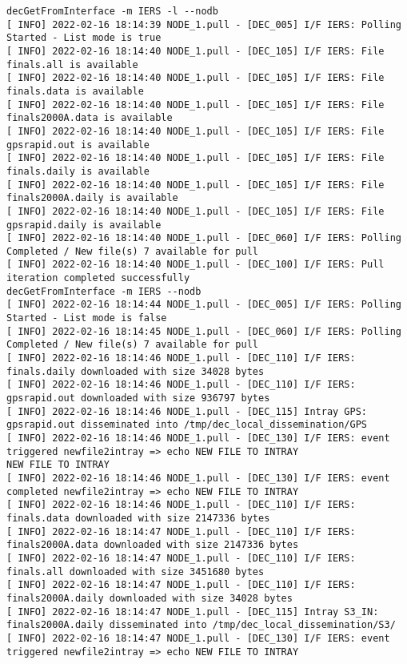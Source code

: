 \documentclass[dec_sum_main.tex]{subfiles}
\begin{document}
\begin{Verbatim}[fontsize=\tiny]
decGetFromInterface -m IERS -l --nodb
[ INFO] 2022-02-16 18:14:39 NODE_1.pull - [DEC_005] I/F IERS: Polling Started - List mode is true
[ INFO] 2022-02-16 18:14:40 NODE_1.pull - [DEC_105] I/F IERS: File finals.all is available
[ INFO] 2022-02-16 18:14:40 NODE_1.pull - [DEC_105] I/F IERS: File finals.data is available
[ INFO] 2022-02-16 18:14:40 NODE_1.pull - [DEC_105] I/F IERS: File finals2000A.data is available
[ INFO] 2022-02-16 18:14:40 NODE_1.pull - [DEC_105] I/F IERS: File gpsrapid.out is available
[ INFO] 2022-02-16 18:14:40 NODE_1.pull - [DEC_105] I/F IERS: File finals.daily is available
[ INFO] 2022-02-16 18:14:40 NODE_1.pull - [DEC_105] I/F IERS: File finals2000A.daily is available
[ INFO] 2022-02-16 18:14:40 NODE_1.pull - [DEC_105] I/F IERS: File gpsrapid.daily is available
[ INFO] 2022-02-16 18:14:40 NODE_1.pull - [DEC_060] I/F IERS: Polling Completed / New file(s) 7 available for pull
[ INFO] 2022-02-16 18:14:40 NODE_1.pull - [DEC_100] I/F IERS: Pull iteration completed successfully
decGetFromInterface -m IERS --nodb
[ INFO] 2022-02-16 18:14:44 NODE_1.pull - [DEC_005] I/F IERS: Polling Started - List mode is false
[ INFO] 2022-02-16 18:14:45 NODE_1.pull - [DEC_060] I/F IERS: Polling Completed / New file(s) 7 available for pull
[ INFO] 2022-02-16 18:14:46 NODE_1.pull - [DEC_110] I/F IERS: finals.daily downloaded with size 34028 bytes
[ INFO] 2022-02-16 18:14:46 NODE_1.pull - [DEC_110] I/F IERS: gpsrapid.out downloaded with size 936797 bytes
[ INFO] 2022-02-16 18:14:46 NODE_1.pull - [DEC_115] Intray GPS: gpsrapid.out disseminated into /tmp/dec_local_dissemination/GPS
[ INFO] 2022-02-16 18:14:46 NODE_1.pull - [DEC_130] I/F IERS: event triggered newfile2intray => echo NEW FILE TO INTRAY
NEW FILE TO INTRAY
[ INFO] 2022-02-16 18:14:46 NODE_1.pull - [DEC_130] I/F IERS: event completed newfile2intray => echo NEW FILE TO INTRAY
[ INFO] 2022-02-16 18:14:46 NODE_1.pull - [DEC_110] I/F IERS: finals.data downloaded with size 2147336 bytes
[ INFO] 2022-02-16 18:14:47 NODE_1.pull - [DEC_110] I/F IERS: finals2000A.data downloaded with size 2147336 bytes
[ INFO] 2022-02-16 18:14:47 NODE_1.pull - [DEC_110] I/F IERS: finals.all downloaded with size 3451680 bytes
[ INFO] 2022-02-16 18:14:47 NODE_1.pull - [DEC_110] I/F IERS: finals2000A.daily downloaded with size 34028 bytes
[ INFO] 2022-02-16 18:14:47 NODE_1.pull - [DEC_115] Intray S3_IN: finals2000A.daily disseminated into /tmp/dec_local_dissemination/S3/
[ INFO] 2022-02-16 18:14:47 NODE_1.pull - [DEC_130] I/F IERS: event triggered newfile2intray => echo NEW FILE TO INTRAY

\end{Verbatim}
\end{document}

